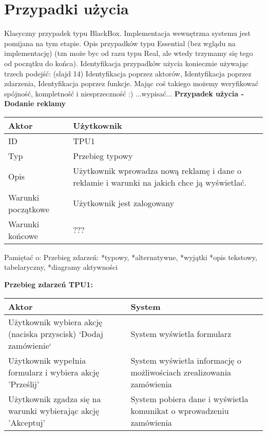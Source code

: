 \documentclass[a4paper,titlepage,twoside,openright]{report} %
\begin{document}
		\section{Przypadki użycia}
		Klasyczny przypadek typu BlackBox. Implementacja wewnętrzna systemu jest pomijana na tym etapie. Opis przypadków typu Essential (bez wglądu na implementację) (tzn może byc od razu typu Real, ale wtedy trzymamy się tego od początku do końca).\newline
		Identyfikacja przypadków użycia koniecznie używając trzech podejść: (slajd 14)\newline
		Identyfikacja poprzez aktorów,\newline
		Identyfikacja poprzez zdarzenia,\newline
		Identyfikacja poprzez funkcje.\newline
		\newline
		Mając coś takiego możemy weryfikować spójność, kompletność i niesprzeczność :)\newline
		...wypisać...\newline
		{\bf Przypadek użycia - Dodanie reklamy}\newline
		\begin{tabular}{|l|p{10cm}|}
		  \hline \hline
		  Aktor & Użytkownik \\ \hline
		  ID & TPU1 \\ \hline
		  Typ & Przebieg typowy \\ \hline
		  Opis & Użytkownik wprowadza nową reklamę i dane o reklamie i warunki na jakich chce ją wyświetlać. \\ \hline
		  Warunki początkowe & Użytkownik jest zalogowany \\ \hline
		  Warunki końcowe & ??? \\
		  \hline
		\end{tabular}

		Pamiętać o:\newline
		Przebieg zdarzeń:\newline
		*typowy,\newline
		*alternatywne,\newline
		*wyjątki\newline
		*opis tekstowy, tabelaryczny,\newline
		*diagramy aktywności\newline

		{\bf Przebieg zdarzeń TPU1:}\newline
		\begin{tabular}{|p{7cm}|p{7cm}|}
		  \hline
		  {\bf Aktor} & {\bf System }\\ \hline
		  \hline \hline
		  Użytkownik wybiera akcję (naciska przyscisk) `Dodaj zamówienie` & System wyświetla formularz \\ \hline
		  Użytkownik wypełnia formularz i wybiera akcję 'Prześlij' & System wyświetla informację o możliwościach zrealizowania zamówienia\\ \hline
		  Użytkownik zgadza się na warunki wybierając akcję 'Akceptuj' & System pobiera dane i wyświetla komunikat o wprowadzeniu zamówienia \\
		  \hline
		\end{tabular}
		
\end{document}
